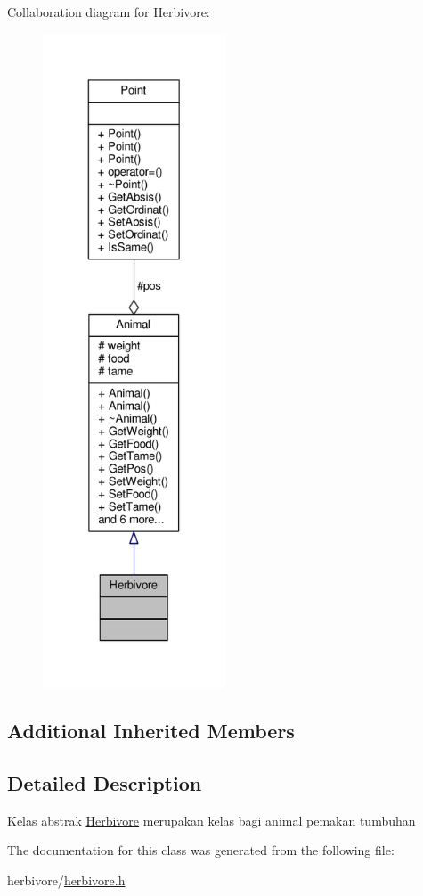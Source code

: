 Collaboration diagram for Herbivore\+:
\nopagebreak
\begin{figure}[H]
\begin{center}
\leavevmode
\includegraphics[height=550pt]{classHerbivore__coll__graph}
\end{center}
\end{figure}
\subsection*{Additional Inherited Members}


\subsection{Detailed Description}
Kelas abstrak \hyperlink{classHerbivore}{Herbivore} merupakan kelas bagi animal pemakan tumbuhan 

The documentation for this class was generated from the following file\+:\begin{DoxyCompactItemize}
\item 
herbivore/\hyperlink{herbivore_8h}{herbivore.\+h}\end{DoxyCompactItemize}
